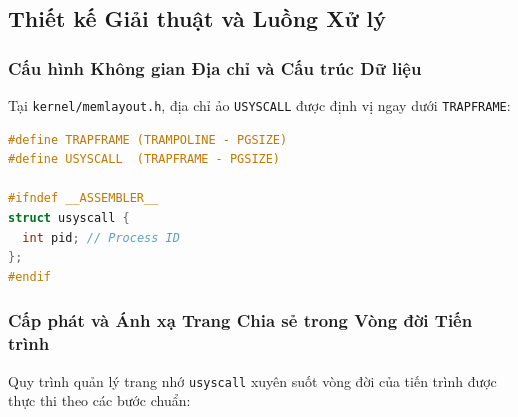 \subsection{Thiết kế Giải thuật và Luồng Xử lý}

\subsubsection{Cấu hình Không gian Địa chỉ và Cấu trúc Dữ liệu}
Tại \texttt{kernel/memlayout.h}, địa chỉ ảo \texttt{USYSCALL} được định vị ngay dưới \texttt{TRAPFRAME}:

\begin{lstlisting}[language=C, caption={Định nghĩa địa chỉ ảo và cấu trúc usyscall}]
#define TRAPFRAME (TRAMPOLINE - PGSIZE)
#define USYSCALL  (TRAPFRAME - PGSIZE)

#ifndef __ASSEMBLER__
struct usyscall {
  int pid; // Process ID
};
#endif
\end{lstlisting}

\subsubsection{Cấp phát và Ánh xạ Trang Chia sẻ trong Vòng đời Tiến trình}
Quy trình quản lý trang nhớ \texttt{usyscall} xuyên suốt vòng đời của tiến trình được thực thi theo các bước chuẩn:

